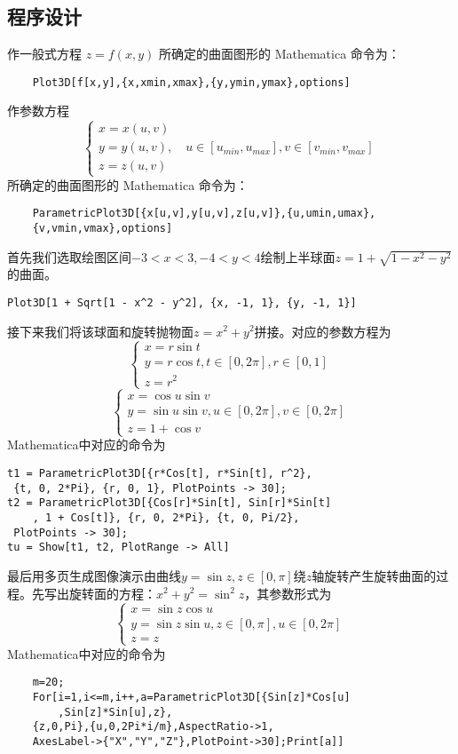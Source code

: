 \documentclass{ctexart}
\begin{document}
\subsection{程序设计}
作一般式方程 $z = f (x, y)$ 所确定的曲面图形的 Mathematica 命令为：
\begin{lstlisting}
	Plot3D[f[x,y],{x,xmin,xmax},{y,ymin,ymax},options]
\end{lstlisting}
作参数方程
\begin{equation}\label{key}
	\begin{cases}
		x=x(u,v)\\
		y=y(u,v),\quad u\in [u_{min},u_{max}],v\in [v_{min},v_{max}] \\
		z=z(u,v)
	\end{cases}
\end{equation}
所确定的曲面图形的 Mathematica 命令为：
\begin{lstlisting}
	ParametricPlot3D[{x[u,v],y[u,v],z[u,v]},{u,umin,umax},
	{v,vmin,vmax},options]
\end{lstlisting}
首先我们选取绘图区间${-3<x<3,-4<y<4}$绘制上半球面$z=1+\sqrt{1-x^2-y^2}$的曲面。
\begin{lstlisting}
Plot3D[1 + Sqrt[1 - x^2 - y^2], {x, -1, 1}, {y, -1, 1}]
\end{lstlisting}
接下来我们将该球面和旋转抛物面$z=x^2+y^2$拼接。对应的参数方程为
\begin{equation}\label{key}
	\begin{cases}
		x=r \sin t\\
		y=r \cos t,t \in [0,2\pi],r\in [0,1]\\
		z=r^2
	\end{cases}
\end{equation}
\begin{equation}\label{key}
	\begin{cases}
		x=\cos u \sin v\\
		y=\sin u \sin v ,u\in [0,2\pi],v\in [0,2\pi]\\
		z=1+\cos v
	\end{cases}
\end{equation}
Mathematica中对应的命令为
\begin{lstlisting}
t1 = ParametricPlot3D[{r*Cos[t], r*Sin[t], r^2},
 {t, 0, 2*Pi}, {r, 0, 1}, PlotPoints -> 30];
t2 = ParametricPlot3D[{Cos[r]*Sin[t], Sin[r]*Sin[t]
	, 1 + Cos[t]}, {r, 0, 2*Pi}, {t, 0, Pi/2},
 PlotPoints -> 30];
tu = Show[t1, t2, PlotRange -> All]
\end{lstlisting}
最后用多页生成图像演示由曲线$y=\sin z,z \in [0,\pi]$绕$z$轴旋转产生旋转曲面的过程。先写出旋转面的方程：$x^2+y^2=\sin^2 z$，其参数形式为
\begin{equation}\label{key}
	\begin{cases}
		x=\sin z \cos u \\
		y=\sin z \sin u,z \in [0,\pi],u \in [0,2\pi]\\
		z=z
	\end{cases}
\end{equation}
Mathematica中对应的命令为
\begin{lstlisting}
	m=20;
	For[i=1,i<=m,i++,a=ParametricPlot3D[{Sin[z]*Cos[u]
		,Sin[z]*Sin[u],z},
	{z,0,Pi},{u,0,2Pi*i/m},AspectRatio->1,
	AxesLabel->{"X","Y","Z"},PlotPoint->30];Print[a]]
\end{lstlisting}
\end{document}
